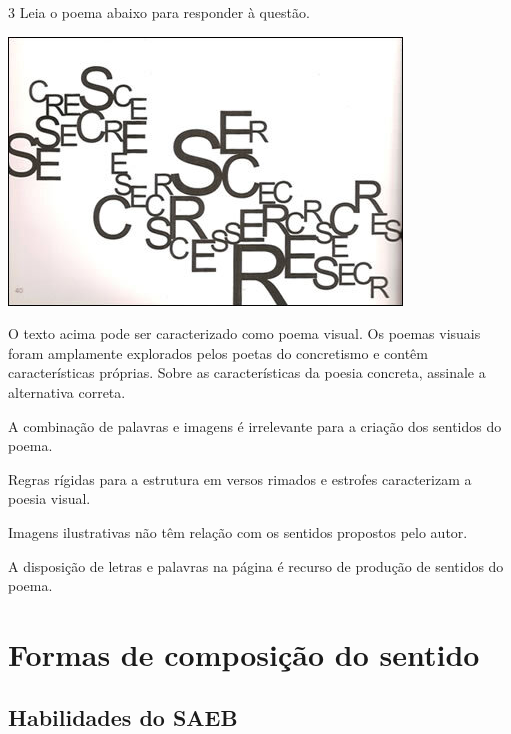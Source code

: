 \num{3} Leia o poema abaixo para responder à questão.

\includegraphics[width=4.11458in,height=2.80208in]{./imgSAEB_7_POR/media/image3.png}


O texto acima pode ser caracterizado como poema visual. Os poemas visuais
foram amplamente explorados pelos poetas do concretismo e contêm
características próprias. Sobre as características da poesia concreta,
assinale a alternativa correta.

\begin{escolha}

  \item A combinação de palavras e imagens é irrelevante para a criação dos sentidos do poema. 

  \item Regras rígidas para a estrutura em versos rimados e estrofes caracterizam a poesia visual.

  \item Imagens ilustrativas não têm relação com os sentidos propostos pelo autor.

  \item A disposição de letras e palavras na página é recurso de produção de sentidos do poema.

\end{escolha}

\chapter{Formas de composição do sentido}

\section{Habilidades do SAEB}

